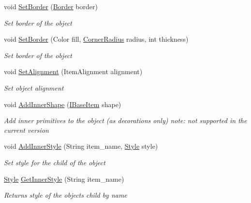 \begin{DoxyCompactItemize}
void \mbox{\hyperlink{class_space_v_i_l_1_1_decorations_1_1_style_a817065fca5e9d8a90859ac6998eb2b33}{Set\+Border}} (\mbox{\hyperlink{class_space_v_i_l_1_1_decorations_1_1_border}{Border}} border)
\begin{DoxyCompactList}\small\item\em Set border of the object \end{DoxyCompactList}\item 
void \mbox{\hyperlink{class_space_v_i_l_1_1_decorations_1_1_style_a34049d6afa31bb37c08b495a0b6d0dba}{Set\+Border}} (Color fill, \mbox{\hyperlink{class_space_v_i_l_1_1_decorations_1_1_corner_radius}{Corner\+Radius}} radius, int thickness)
\begin{DoxyCompactList}\small\item\em Set border of the object \end{DoxyCompactList}\item 
void \mbox{\hyperlink{class_space_v_i_l_1_1_decorations_1_1_style_a49dfa21104c12d8d2c0078f3bd9310aa}{Set\+Alignment}} (Item\+Alignment alignment)
\begin{DoxyCompactList}\small\item\em Set object alignment \end{DoxyCompactList}\item 
void \mbox{\hyperlink{class_space_v_i_l_1_1_decorations_1_1_style_ae4e785fa8ccbd1344118f85bd9876f76}{Add\+Inner\+Shape}} (\mbox{\hyperlink{interface_space_v_i_l_1_1_core_1_1_i_base_item}{I\+Base\+Item}} shape)
\begin{DoxyCompactList}\small\item\em Add inner primitives to the object (as decorations only) note\+: not supported in the current version \end{DoxyCompactList}\item 
void \mbox{\hyperlink{class_space_v_i_l_1_1_decorations_1_1_style_a8a6ad9d73ab3298887c280327acca616}{Add\+Inner\+Style}} (String item\+\_\+name, \mbox{\hyperlink{class_space_v_i_l_1_1_decorations_1_1_style}{Style}} style)
\begin{DoxyCompactList}\small\item\em Set style for the child of the object \end{DoxyCompactList}\item 
\mbox{\hyperlink{class_space_v_i_l_1_1_decorations_1_1_style}{Style}} \mbox{\hyperlink{class_space_v_i_l_1_1_decorations_1_1_style_ac96f01bb7a62301810a935292a9066f9}{Get\+Inner\+Style}} (String item\+\_\+name)
\begin{DoxyCompactList}\small\item\em Returns style of the object\textquotesingle{}s child by name \end{DoxyCompactList}\item 

\end{DoxyCompactItemize}
